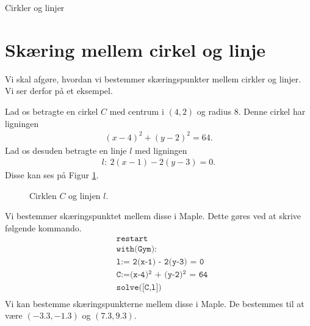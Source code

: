 \documentclass[12pt]{article}
\begin{document}






\begin{center}
\Huge
Cirkler og linjer
\end{center}

\section*{Skæring mellem cirkel og linje}
Vi skal afgøre, hvordan vi bestemmer skæringspunkter mellem cirkler og linjer. Vi ser derfor på et eksempel.
\begin{exa}
	Lad os betragte en cirkel $C$ med centrum i $(4,2)$ og radius 8. Denne 
	cirkel har ligningen 
	\begin{align*}
		(x-4)^2 + (y-2)^2 = 64.
	\end{align*}
	Lad os desuden betragte en linje $l$ med ligningen
	\begin{align*}
		l: \ 2(x-1) -2(y-3) = 0. 
	\end{align*}
	Disse kan ses på Figur \ref{fig:cirkellinje}.
	\begin{figure}[H]
		\centering
		\caption{Cirklen $C$ og linjen $l$.}
		\label{fig:cirkellinje}
	\end{figure}
	Vi bestemmer skæringspunktet mellem disse i Maple. Dette gøres ved at skrive følgende kommando. 
	\begin{align*}
		&\texttt{restart}\\
		&\texttt{with(Gym):}\\
		&\texttt{l:= 2(x-1) - 2(y-3) = 0}\\
		&\texttt{C:=(x-4)$^\texttt{2}$ + (y-2)$^\texttt{2}$ = 64}\\
		&\texttt{solve([C,l])}\\
	\end{align*}
	Vi kan bestemme skæringspunkterne mellem disse i Maple. De bestemmes til at være $(-3.3, -1.3)$ og $(7.3,9.3)$. 
\end{exa}
\end{document}
